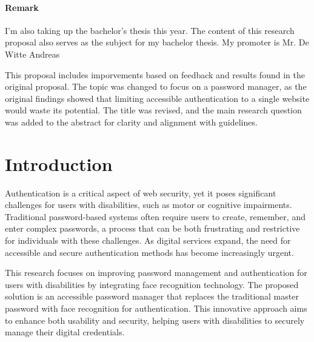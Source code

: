 



\bigskip

\vspace{2\baselineskip} %
\paragraph{Remark}

I'm also taking up the bachelor's thesis this year. The content of this research proposal also serves as the subject for my bachelor thesis. My promoter is Mr. De Witte Andreas

This proposal includes imporvements based on feedback and results found in the original proposal. The topic was changed to focus on a password manager, as the original findings showed that limiting accessible authentication to a single website would waste its potential. The title was revised, and the main research question was added to the abstract for clarity and alignment with guidelines.
\clearpage

\section{Introduction}%
\label{sec:Introduction}
Authentication is a critical aspect of web security, yet it poses significant challenges for users with disabilities, such as motor or cognitive impairments. Traditional password-based systems often require users to create, remember, and enter complex passwords, a process that can be both frustrating and restrictive for individuals with these challenges. As digital services expand, the need for accessible and secure authentication methods has become increasingly urgent.

This research focuses on improving password management and authentication for users with disabilities by integrating face recognition technology. The proposed solution is an accessible password manager that replaces the traditional master password with face recognition for authentication. This innovative approach aims to enhance both usability and security, helping users with disabilities to  securely manage their digital credentials.

